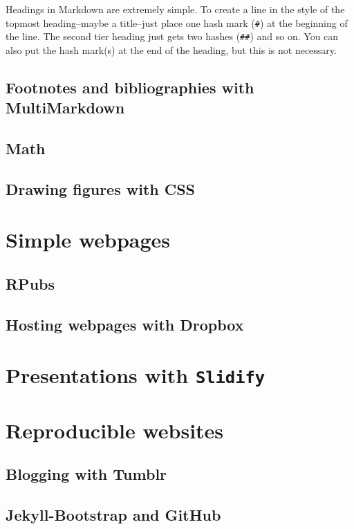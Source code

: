 \documentclass[ChapterTOCs,krantz1]{krantz}\usepackage{graphicx, color}
\begin{document}
Headings in Markdown are extremely simple. To create a line in the style
of the topmost heading--maybe a title--just place one hash mark
(\texttt{\#}) at the beginning of the line. The second tier heading just
gets two hashes (\texttt{\#\#}) and so on. You can also put the hash
mark(s) at the end of the heading, but this is not necessary.

\subsection{Footnotes and bibliographies with MultiMarkdown}

\subsection{Math}

\subsection{Drawing figures with CSS}

\section{Simple webpages}

\subsection{RPubs}

\subsection{Hosting webpages with Dropbox}

\section{Presentations with \texttt{Slidify}}

\section{Reproducible websites}

\subsection{Blogging with Tumblr}

\subsection{Jekyll-Bootstrap and GitHub}
\end{document}
